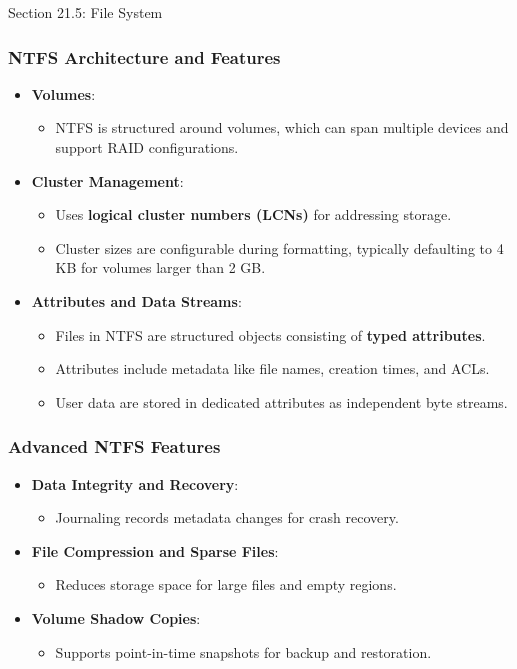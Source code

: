 \begin{notes}{Section 21.5: File System}
    \subsubsection*{NTFS Architecture and Features}
    \begin{itemize}
        \item \textbf{Volumes}:
        \begin{itemize}
            \item NTFS is structured around volumes, which can span multiple devices and support RAID configurations.
        \end{itemize}
        \item \textbf{Cluster Management}:
        \begin{itemize}
            \item Uses \textbf{logical cluster numbers (LCNs)} for addressing storage.
            \item Cluster sizes are configurable during formatting, typically defaulting to 4 KB for volumes larger than 2 GB.
        \end{itemize}
        \item \textbf{Attributes and Data Streams}:
        \begin{itemize}
            \item Files in NTFS are structured objects consisting of \textbf{typed attributes}.
            \item Attributes include metadata like file names, creation times, and ACLs.
            \item User data are stored in dedicated attributes as independent byte streams.
        \end{itemize}
    \end{itemize}

    \subsubsection*{Advanced NTFS Features}
    \begin{itemize}
        \item \textbf{Data Integrity and Recovery}:
        \begin{itemize}
            \item Journaling records metadata changes for crash recovery.
        \end{itemize}
        \item \textbf{File Compression and Sparse Files}:
        \begin{itemize}
            \item Reduces storage space for large files and empty regions.
        \end{itemize}
        \item \textbf{Volume Shadow Copies}:
        \begin{itemize}
            \item Supports point-in-time snapshots for backup and restoration.
        \end{itemize}
    \end{itemize}


\end{notes}
